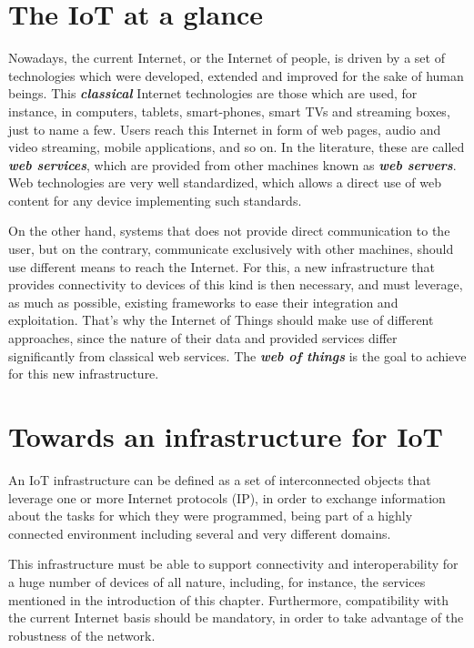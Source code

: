 \section{The IoT at a glance}
\label{subsec:IoTAtAGlance}
Nowadays, the current Internet, or the Internet of people, is driven by a set of technologies which were developed, extended and improved for the sake of human beings.
This \textit{\textbf{classical}} Internet technologies are those which are used, for instance, in computers, tablets, smart-phones, smart TVs and streaming boxes, just to name a few.
Users reach this Internet in form of web pages, audio and video streaming, mobile applications, and so on.
In the literature, these are called \textit{\textbf{web services}}, which are provided from other machines known as \textit{\textbf{web servers}}.
Web technologies are very well standardized, which allows a direct use of web content for any device implementing such standards.

On the other hand, systems that does not provide direct communication to the user, but on the contrary, communicate exclusively with other machines, should use different means to reach the Internet.
For this, a new infrastructure that provides connectivity to devices of this kind is then necessary, and must leverage, as much as possible, existing frameworks to ease their integration and exploitation.
That's why the Internet of Things should make use of different approaches, since the nature of their data and provided services differ significantly from classical web services.
The \textit{\textbf{web of things}}\cite{duquennoy2009webofthings} is the goal to achieve for this new infrastructure.

\section{Towards an infrastructure for IoT}
\label{sec:IoTInfra}
An IoT infrastructure can be defined as a set of interconnected objects that leverage one or more Internet protocols (IP), in order to exchange information about the tasks for which they were programmed, being part of a highly connected environment including several and very different domains.

This infrastructure must be able to support connectivity and interoperability for a huge number of devices of all nature, including, for instance, the services mentioned in the introduction of this chapter.
Furthermore, compatibility with the current Internet basis should be mandatory, in order to take advantage of the robustness of the network.

